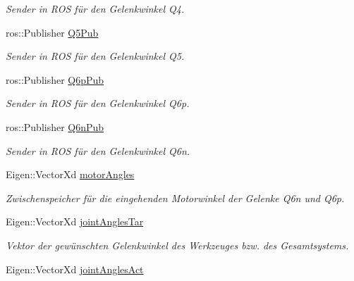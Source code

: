 \begin{DoxyCompactItemize}
\begin{DoxyCompactList}\small\item\em Sender in R\-O\-S für den Gelenkwinkel Q4. \end{DoxyCompactList}\item 
\hypertarget{classICommander_a7ccda2ae0d3445b0182d215511288d3b}{ros\-::\-Publisher \hyperlink{classICommander_a7ccda2ae0d3445b0182d215511288d3b}{Q5\-Pub}}\label{classICommander_a7ccda2ae0d3445b0182d215511288d3b}

\begin{DoxyCompactList}\small\item\em Sender in R\-O\-S für den Gelenkwinkel Q5. \end{DoxyCompactList}\item 
\hypertarget{classICommander_ac970af125f62bb073bbfa1aed1d92459}{ros\-::\-Publisher \hyperlink{classICommander_ac970af125f62bb073bbfa1aed1d92459}{Q6p\-Pub}}\label{classICommander_ac970af125f62bb073bbfa1aed1d92459}

\begin{DoxyCompactList}\small\item\em Sender in R\-O\-S für den Gelenkwinkel Q6p. \end{DoxyCompactList}\item 
\hypertarget{classICommander_a01e435c9f23dadd81033b6482a042553}{ros\-::\-Publisher \hyperlink{classICommander_a01e435c9f23dadd81033b6482a042553}{Q6n\-Pub}}\label{classICommander_a01e435c9f23dadd81033b6482a042553}

\begin{DoxyCompactList}\small\item\em Sender in R\-O\-S für den Gelenkwinkel Q6n. \end{DoxyCompactList}\item 
Eigen\-::\-Vector\-Xd \hyperlink{classICommander_ab1ed71f514ce422461e6cae7fb6e3c04}{motor\-Angles}
\begin{DoxyCompactList}\small\item\em Zwischenspeicher für die eingehenden Motorwinkel der Gelenke Q6n und Q6p. \end{DoxyCompactList}\item 
\hypertarget{classICommander_a8d15c8d08f17b853ecb8437e4f68b4a6}{Eigen\-::\-Vector\-Xd \hyperlink{classICommander_a8d15c8d08f17b853ecb8437e4f68b4a6}{joint\-Angles\-Tar}}\label{classICommander_a8d15c8d08f17b853ecb8437e4f68b4a6}

\begin{DoxyCompactList}\small\item\em Vektor der gewünschten Gelenkwinkel des Werkzeuges bzw. des Gesamtsystems. \end{DoxyCompactList}\item 
\hypertarget{classICommander_a7f66c83e970a1d8543be3a6c553dcd06}{Eigen\-::\-Vector\-Xd \hyperlink{classICommander_a7f66c83e970a1d8543be3a6c553dcd06}{joint\-Angles\-Act}}\label{classICommander_a7f66c83e970a1d8543be3a6c553dcd06}


\end{DoxyCompactItemize}
